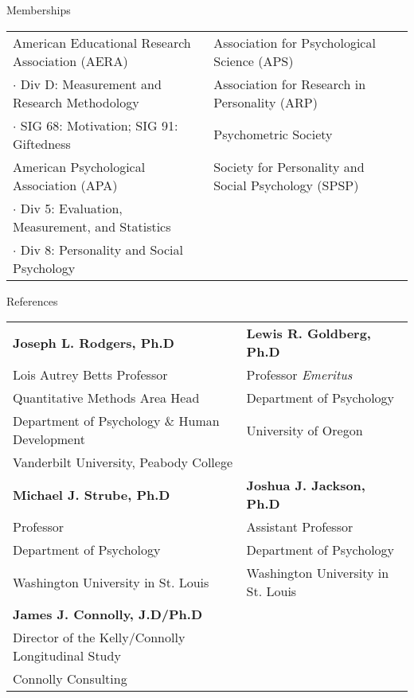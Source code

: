 \documentclass {resume}
\begin{document}
\begin{samepage}\begin{rSection}{\textrm{Memberships}}
\begin{tabular}{ l l }
American Educational Research Association (AERA)& Association for Psychological Science (APS) \\
$\cdot$ {\small Div D: Measurement and Research Methodology} &  Association for Research in Personality (ARP)\\
$\cdot$ {\small SIG 68: Motivation; SIG 91: Giftedness}& Psychometric Society\\
American Psychological Association (APA) & Society for Personality and Social Psychology (SPSP)\\
$\cdot$ {\small Div 5: Evaluation, Measurement, and Statistics}
\\
$\cdot$ {\small Div 8: Personality and Social Psychology} \\
\end{tabular}
\end{rSection}\end{samepage}

\begin{samepage}\begin{rSection}{\textrm{References}}
\begin{tabular}{ l l }
\textbf{Joseph L. Rodgers, Ph.D} & \textbf{Lewis R. Goldberg, Ph.D}\\Lois Autrey Betts Professor & Professor \textit{Emeritus}\\
Quantitative Methods Area Head & Department of Psychology\\
Department of Psychology $\&$ Human Development & University of Oregon\\
Vanderbilt University, Peabody College & \bigskip\\

\textbf{Michael J. Strube, Ph.D} & \textbf{Joshua J. Jackson, Ph.D}\\
Professor & Assistant Professor\\
Department of Psychology & Department of Psychology\\
Washington University in St. Louis & Washington University in St. Louis\bigskip\\
\textbf{James J. Connolly, J.D/Ph.D} 
\\
Director of the Kelly/Connolly Longitudinal Study\\ 
Connolly Consulting\\
\end{tabular}
\end{rSection}\end{samepage}
\end{document}
